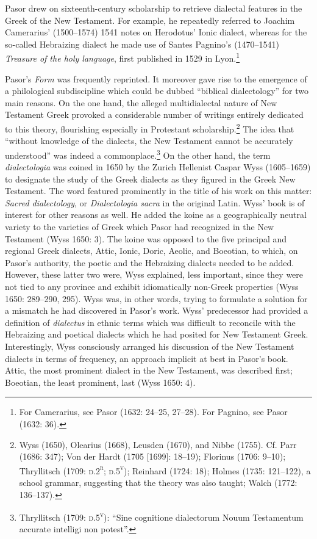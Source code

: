 \begin{styleStandard}
Pasor drew on sixteenth-century scholarship to retrieve dialectal features in the Greek of the New Testament. For example, he repeatedly referred to Joachim Camerarius’ (1500–1574) 1541 notes on Herodotus’ Ionic dialect, whereas for the so-called Hebraizing dialect he made use of Santes Pagnino’s (1470–1541) \textit{Treasure of the holy language}, first published in 1529 in Lyon.\footnote{ For Camerarius, see Pasor (1632: 24–25, 27–28). For Pagnino, see Pasor (1632: 36).}
\end{styleStandard}

\begin{styleStandard}
Pasor’s \textit{Form} was frequently reprinted. It moreover gave rise to the emergence of a philological subdiscipline which could be dubbed “biblical dialectology” for two main reasons. On the one hand, the alleged multidialectal nature of New Testament Greek provoked a considerable number of writings entirely dedicated to this theory, flourishing especially in Protestant scholarship.\footnote{ Wyss (1650), Olearius (1668), Leusden (1670), and Nibbe (1755). Cf. Parr (1686: 347); Von der Hardt (1705 [1699]: 18–19); Florinus (1706: 9–10); Thryllitsch (1709: \textsc{d.2}\textsc{\textsuperscript{r}}; \textsc{d.5}\textsc{\textsuperscript{v}}); Reinhard (1724: 18); Holmes (1735: 121–122), a school grammar, suggesting that the theory was also taught; Walch (1772: 136–137).} The idea that “without knowledge of the dialects, the New Testament cannot be accurately understood” was indeed a commonplace.\footnote{ Thryllitsch (1709: \textsc{d.5}\textsc{\textsuperscript{v}}): “Sine cognitione dialectorum Nouum Testamentum accurate intelligi non potest”.} On the other hand, the term \textit{dialectologia} was coined in 1650 by the Zurich Hellenist Caspar Wyss (1605–1659) to designate the study of the Greek dialects as they figured in the Greek New Testament. The word featured prominently in the title of his work on this matter: \textit{Sacred dialectology}, or \textit{Dialectologia sacra} in the original Latin. Wyss’ book is of interest for other reasons as well. He added the koine as a geographically neutral variety to the varieties of Greek which Pasor had recognized in the New Testament (Wyss 1650: 3). The koine was opposed to the five principal and regional Greek dialects, Attic, Ionic, Doric, Aeolic, and Boeotian, to which, on Pasor’s authority, the poetic and the Hebraizing dialects needed to be added. However, these latter two were, Wyss explained, less important, since they were not tied to any province and exhibit idiomatically non-Greek properties (Wyss 1650: 289–290, 295). Wyss was, in other words, trying to formulate a solution for a mismatch he had discovered in Pasor’s work. Wyss’ predecessor had provided a definition of \textit{dialectus }in ethnic terms which was difficult to reconcile with the Hebraizing and poetical dialects which he had posited for New Testament Greek. Interestingly, Wyss consciously arranged his discussion of the New Testament dialects in terms of frequency, an approach implicit at best in Pasor’s book. Attic, the most prominent dialect in the New Testament, was described first; Boeotian, the least prominent, last (Wyss 1650: 4).

\end{styleStandard}
